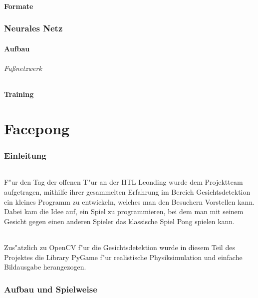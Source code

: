 \documentclass[12pt]{article}
\begin{document}
\subsection{Formate}
\label{formats}

\section{Neurales Netz}
\subsection{Aufbau}
\paragraph{Fußnetzwerk}
\label{neuralfoot}
\subsection{Training}



\part{Facepong}
\section{Einleitung}
\paragraph{}
F"ur den Tag der offenen T"ur an der HTL Leonding wurde dem Projektteam
aufgetragen, mithilfe ihrer gesammelten Erfahrung im Bereich Gesichtsdetektion
ein kleines Programm zu entwickeln, welches man den Besuchern Vorstellen kann.
Dabei kam die Idee auf, ein Spiel zu programmieren, bei dem man mit seinem Gesicht
gegen einen anderen Spieler das klassische Spiel \glqq Pong\grqq{} spielen kann.
\paragraph{}
Zus"atzlich zu OpenCV f"ur die Gesichtsdetektion wurde in diesem Teil des Projektes
die Library PyGame f"ur realistische Physiksimulation und einfache Bildausgabe
herangezogen.
\section{Aufbau und Spielweise}
\end{document}

